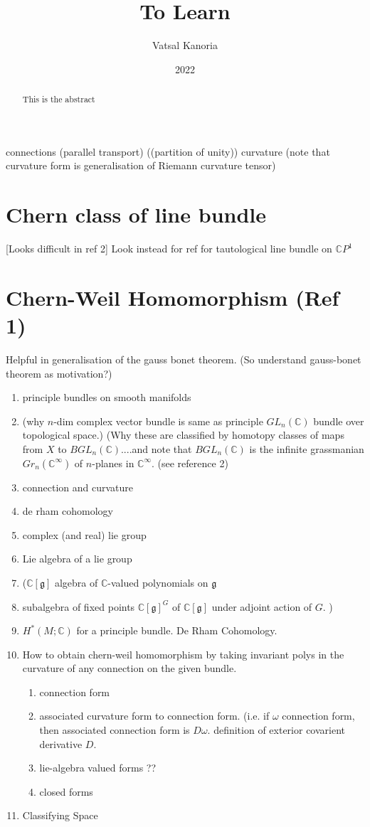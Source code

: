 \documentclass[a4paper]{article}
\theoremstyle{definition} \newtheorem*{definition}{Definition}
\theoremstyle{definition} \newtheorem*{definitions}{Definitions}
\theoremstyle{plain} \newtheorem{theorem}{Theorem}[section]
\theoremstyle{plain} \newtheorem{proposition}[theorem]{Proposition}
\theoremstyle{plain} \newtheorem{corollary}[theorem]{Corollary}
\theoremstyle{plain} \newtheorem{lemma}[theorem]{Lemma}
\theoremstyle{plain} \newtheorem{example}[theorem]{Example}
\begin{document}
\title{To Learn}
\author{Vatsal Kanoria}
\date{2022}
\maketitle
\begin{abstract}
This is the abstract
\end{abstract}
\tableofcontents


connections
(parallel transport)
((partition of unity))
curvature
(note that curvature form is generalisation of Riemann curvature tensor)

\section{Chern class of line bundle}
[Looks difficult in ref 2]
Look instead for ref for tautological line bundle on $\mathbb{C}P^1$

\section{Chern-Weil Homomorphism (Ref 1)}
Helpful in generalisation of the gauss bonet theorem.
(So understand gauss-bonet theorem as motivation?)

\begin{enumerate}
\item principle bundles on smooth manifolds
\item (why $n$-dim complex vector bundle is same as principle $GL_n(\mathbb{C})$ bundle over topological space.) (Why these are classified by homotopy classes of maps from $X$ to $B GL_n(\mathbb{C})$....and note that $B GL_n(\mathbb{C})$ is the infinite grassmanian $Gr_n(\mathbb{C}^\infty)$ of $n$-planes in $\mathbb{C}^\infty$.  (see reference 2) 
\item connection and curvature
\item de rham cohomology
\item complex (and real) lie group
\item Lie algebra of a lie group
\item ($\mathbb{C}[\mathfrak{g}]$ algebra of $\mathbb{C}$-valued polynomials on $\mathfrak{g}$
\item subalgebra of fixed points $\mathbb{C}[\mathfrak{g}]^G$ of $\mathbb{C}[\mathfrak{g}]$ under adjoint action of $G$. )
\item $H^*(M; \mathbb{C})$ for a principle bundle.  De Rham Cohomology.
\item How to obtain chern-weil homomorphism by taking invariant polys in the curvature of any connection on the given bundle. 
\begin{enumerate}
\item connection form
\item associated curvature form to connection form.  (i.e. if $\omega$ connection form,  then associated connection form is $D\omega$.  definition of exterior covarient derivative $D$. 
\item lie-algebra valued forms ??
\item closed forms
\end{enumerate}
\item Classifying Space
\end{enumerate}
\end{document}
